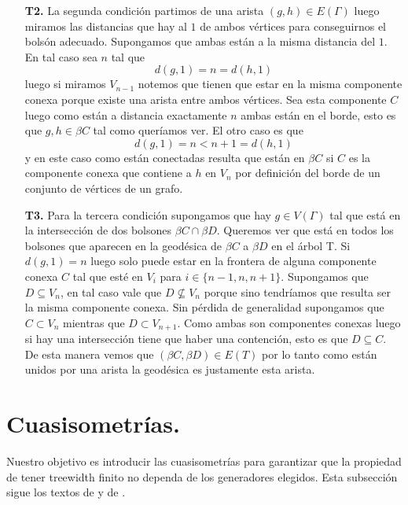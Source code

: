 \documentclass[tesis.tex]{subfiles}
\begin{document}
\begin{ej}
\begin{enumerate}
		\item[\textbf{T2.}] La segunda condición partimos de una arista $(g,h) \in E(\Gamma)$ luego miramos las distancias que hay al $1$ de ambos vértices para conseguirnos el bolsón adecuado. 
		Supongamos que ambas están a la misma distancia del $1$. En tal caso sea $n$ tal que 
		\[
			d(g,1)=n = d(h,1)
		\] 
		luego si miramos $V_{n-1}$ notemos que tienen que estar en la misma componente conexa porque existe una arista entre ambos vértices. Sea esta componente $C$ luego como están a distancia exactamente $n$ ambas están en el borde, esto es que $g,h \in \beta C$ tal como queríamos ver. 
		El otro caso es que 
		\[
			d(g,1)=n < n+1 = d(h,1)
		\] 
		y en este caso como están conectadas resulta que están en $\beta C$ si $C$ es la componente conexa que contiene a $h$ en $V_n$ por definición del borde de un conjunto de vértices de un grafo.
		
		\item[\textbf{T3.}] Para la tercera condición supongamos que hay $g \in V(\Gamma)$ tal que está en la intersección de dos bolsones $\beta C \cap \beta D$. 
		Queremos ver que está en todos los bolsones que aparecen en la geodésica de $\beta C$ a $\beta D$ en el árbol T. 
		Si $d(g,1) = n$ luego solo puede estar en la frontera de alguna componente conexa $C$ tal que esté en $V_{i}$ para $i\in \{n-1, n, n+1\}$. 
		Supongamos que $D \subseteq V_{n}$, en tal caso vale que $D \nsubseteq V_{n}$ porque sino tendríamos que resulta ser la misma componente conexa. 
		Sin pérdida de generalidad supongamos que $C \subset V_n$ mientras que $D \subset V_{n+1}$. 
		Como ambas son componentes conexas luego si hay una intersección tiene que haber una contención, esto es que $D \subseteq C$. 
		De esta manera vemos que $(\beta C, \beta D) \in E(T)$ por lo tanto como están unidos por una arista la geodésica es justamente esta arista.
		
	\end{enumerate}
\end{ej}

\section{Cuasisometrías.}

Nuestro objetivo es introducir las cuasisometrías para garantizar que la propiedad de tener treewidth finito no dependa de los generadores elegidos.
Esta subsección sigue los textos de \cite{bridson2013metric} y de \cite{loh2017geometric}.
\end{document}

